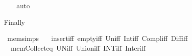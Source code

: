 \begin{isabellebody}
%
\isadelimproof
\ \ %
\endisadelimproof
%
\isatagproof
{}\isamarkupfalse%
\ auto%
\endisatagproof
{\isafoldproof}%
%
\isadelimproof
%
\endisadelimproof
%
\begin{isamarkuptext}%
Finally%
\end{isamarkuptext}\isamarkuptrue%
\isamarkupfalse%
\ mem{\isacharunderscore}{\kern0pt}simps\ {\isacharequal}{\kern0pt}\isanewline
\ \ insert{\isacharunderscore}{\kern0pt}iff\ empty{\isacharunderscore}{\kern0pt}iff\ Un{\isacharunderscore}{\kern0pt}iff\ Int{\isacharunderscore}{\kern0pt}iff\ Compl{\isacharunderscore}{\kern0pt}iff\ Diff{\isacharunderscore}{\kern0pt}iff\isanewline
\ \ mem{\isacharunderscore}{\kern0pt}Collect{\isacharunderscore}{\kern0pt}eq\ UN{\isacharunderscore}{\kern0pt}iff\ Union{\isacharunderscore}{\kern0pt}iff\ INT{\isacharunderscore}{\kern0pt}iff\ Inter{\isacharunderscore}{\kern0pt}iff\isanewline
\ \ %
\isanewline
%
\isadelimtheory
\isanewline
%
\endisadelimtheory
%
\isatagtheory
{}\isamarkupfalse%
%
\endisatagtheory
{\isafoldtheory}%
%
\isadelimtheory
%
\endisadelimtheory
%
\end{isabellebody}%
\endinput
